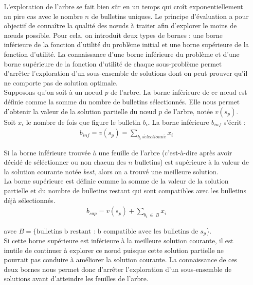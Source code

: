 \documentclass[11pt, a4paper]{article}
\begin{document}
L'exploration de l'arbre se fait bien s\^{u}r en un temps qui cro\^it exponentiellement au pire cas avec le nombre $n$ de bulletins uniques. Le principe d'\'{e}valuation a pour objectif de conna\^{i}tre la qualit\'{e} des n\oe{}uds \`{a} traiter afin d'explorer le moins de nœuds possible. Pour cela, on introduit deux types de bornes : une borne inf\'{e}rieure de la fonction d'utilit\'{e} du probl\`{e}me initial et une borne sup\'{e}rieure de la fonction d'utilit\'{e}. La connaissance d'une borne inf\'{e}rieure du probl\`{e}me et d'une borne sup\'{e}rieure de la fonction d'utilit\'{e} de chaque sous-probl\`{e}me permet d'arr\^{e}ter l'exploration d'un sous-ensemble de solutions dont on peut prouver qu'il ne comporte pas de solution optimale.\\

Supposons qu'on soit \`{a} un noeud $p$ de l'arbre. La borne inf\'erieure de ce n\oe{}ud est d\'efinie comme la somme du nombre de bulletins s\'{e}lectionn\'{e}s. Elle nous permet d'obtenir la valeur de la solution partielle du n\oe{}ud $p$ de l'arbre, not\'{e}e $v(s_p)$. Soit $x_{i}$ le nombre de fois que figure le bulletin $b_{i}$. La borne inférieure $b_{inf}$ s'écrit :
%
\begin{align*}
b_{inf} = v(s_p) = \sum_{b_i~s\acute{e}lectionn\acute{e}} x_{i}
\end{align*}

\noindent{}Si la borne inf\'{e}rieure trouv\'{e}e \`{a} une feuille de l'arbre (c'est-\`{a}-dire apr\`{e}s avoir d\'{e}cid\'{e} de s\'{e}l\'{e}ctionner ou non chacun des $n$ bulletins) est sup\'{e}rieure \`{a} la valeur de la solution courante not\'{e}e \textit{best}, alors on a trouv\'{e} une meilleure solution.\\

La borne sup\'erieure est d\'efinie comme la somme de la valeur de la solution partielle et du nombre de bulletins restant qui sont compatibles avec les bulletins d\'{e}j\`{a} s\'{e}lectionn\'{e}s.
%
\begin{align*}
b_{sup} = v(s_p) + \sum_{b_i ~\in~ B} x_{i}
\end{align*}

\noindent{}avec $B= \{\text{bulletins b restant : b compatible avec les bulletins de } s_{p}$\}.\\

\noindent{}Si cette borne sup\'{e}rieure est inf\'{e}rieure \`{a} la meilleure solution courante, il est inutile de continuer \`{a} explorer ce n\oe ud puisque cette solution partielle ne pourrait pas conduire \`{a} am\'{e}liorer la solution courante. La connaissance de ces deux bornes nous permet donc d'arr\^eter l'exploration d'un sous-ensemble de solutions avant d'atteindre les feuilles de l'arbre.\\
\end{document}
